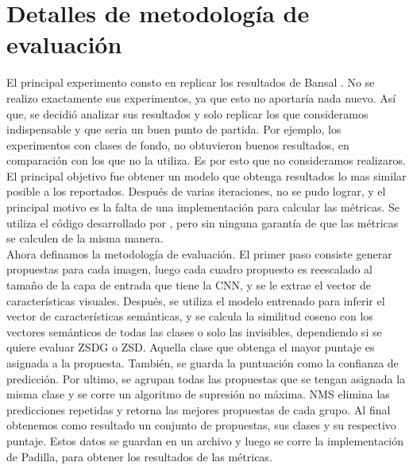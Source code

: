 \section{Detalles de metodología de evaluación}
El principal experimento consto en replicar los resultados de Bansal \cite{bansal2018zero}. No se realizo exactamente sus experimentos, ya que esto no aportaría nada nuevo. Así que, se decidió analizar sus resultados y solo replicar los que consideramos indispensable y que seria un buen punto de partida. Por ejemplo, los experimentos con clases de fondo, no obtuvieron buenos resultados, en comparación con los que no la utiliza. Es por esto que no consideramos realizaros. El principal objetivo fue obtener un modelo que obtenga resultados lo mas similar posible a los reportados. Después de varias iteraciones, no se pudo lograr, y el principal motivo es la falta de una implementación para calcular las métricas. Se utiliza el código desarrollado por \cite{padilla2020survey}, pero sin ninguna garantía de que las métricas se calculen de la misma manera.\\

Ahora definamos la metodología de evaluación. El primer paso consiste generar propuestas para cada imagen, luego cada cuadro propuesto es reescalado al tamaño de la capa de entrada que tiene la CNN, y se le extrae el vector de características visuales. Después, se utiliza el modelo entrenado para inferir el vector de características semánticas, y se calcula la similitud coseno con los vectores semánticos de todas las clases o solo las invisibles, dependiendo si se quiere evaluar ZSDG o ZSD. Aquella clase que obtenga el mayor puntaje es asignada a la propuesta. También, se guarda la puntuación como la confianza de predicción.  Por ultimo, se agrupan todas las propuestas que se tengan asignada la misma clase y se corre un algoritmo de supresión no máxima. NMS elimina las predicciones repetidas y retorna las mejores propuestas de cada grupo. Al final obtenemos como resultado un conjunto de propuestas, sus clases y su respectivo puntaje. Estos datos se guardan en un archivo y luego se corre la implementación de Padilla, para obtener los resultados de las métricas.\\


